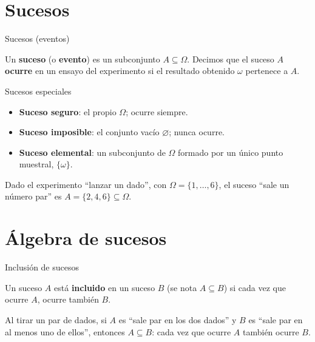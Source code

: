 \documentclass[aspectratio=169,11pt]{beamer}
\begin{document}
\section{Sucesos}

\begin{frame}{Sucesos (eventos)}
\begin{definition}
Un \textbf{suceso} (o \textbf{evento}) es un subconjunto $A \subseteq \Omega$. Decimos que el suceso $A$ \textbf{ocurre} en un ensayo del experimento si el resultado obtenido $\omega$ pertenece a $A$.
\end{definition}

\begin{block}{Sucesos especiales}
\begin{itemize}
\item \textbf{Suceso seguro}: el propio $\Omega$; ocurre siempre.
\item \textbf{Suceso imposible}: el conjunto vacío $\varnothing$; nunca ocurre.
\item \textbf{Suceso elemental}: un subconjunto de $\Omega$ formado por un único punto muestral, $\{\omega\}$.
\end{itemize}
\end{block}

\begin{example}
Dado el experimento ``lanzar un dado'', con $\Omega=\{1,\dots,6\}$, el suceso ``sale un número par'' es $A = \{2,4,6\} \subseteq \Omega$.
\end{example}
\end{frame}

\section{Álgebra de sucesos}

\begin{frame}{Inclusión de sucesos}
\begin{definition}
Un suceso $A$ está \textbf{incluido} en un suceso $B$ (se nota $A \subseteq B$) si cada vez que ocurre $A$, ocurre también $B$.
\end{definition}

\begin{example}
Al tirar un par de dados, si $A$ es ``sale par en los dos dados'' y $B$ es ``sale par en al menos uno de ellos'', entonces $A \subseteq B$: cada vez que ocurre $A$ también ocurre $B$.
\end{example}
\end{frame}
\end{document}

